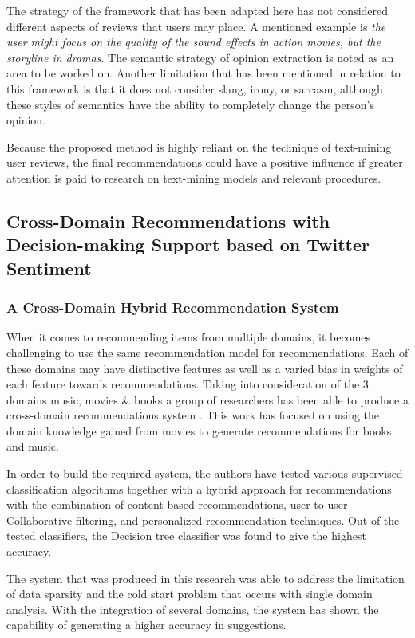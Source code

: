 \documentclass[manuscript,screen,review]{acmart}
\begin{document}
The strategy of the framework that has been adapted here has not considered different aspects of reviews that users may place. A mentioned example is \emph{the user might focus on the quality of the sound effects in action movies, but the storyline in dramas}. The semantic strategy of opinion extraction is noted as an area to be worked on. Another limitation that has been mentioned in relation to this framework is that it does not consider slang, irony, or sarcasm, although these styles of semantics have the ability to completely change the person's opinion.

Because the proposed method is highly reliant on the technique of text-mining user reviews, the final recommendations could have a positive influence if greater attention is paid to research on text-mining models and relevant procedures.


\subsection{Cross-Domain Recommendations with Decision-making Support based on Twitter Sentiment}
\subsubsection{A Cross-Domain Hybrid Recommendation System}
When it comes to recommending items from multiple domains, it becomes challenging to use the same recommendation model for recommendations. Each of these domains may have distinctive features as well as a varied bias in weights of each feature towards recommendations.
Taking into consideration of the 3 domains music, movies \& books a group of researchers has been able to produce a cross-domain recommendations system \cite{pes_universitydepartment_of_computer_science_bangalore_560085_india_cross-domain_2018}. This work has focused on using the domain knowledge gained from movies to generate recommendations for books and music.

In order to build the required system, the authors have tested various supervised classification algorithms together with a hybrid approach for recommendations with the combination of content-based recommendations, user-to-user Collaborative filtering, and personalized recommendation techniques. Out of the tested classifiers, the Decision tree classifier was found to give the highest accuracy.

The system that was produced in this research was able to address the limitation of data sparsity and the cold start problem that occurs with single domain analysis. With the integration of several domains, the system has shown the capability of generating a higher accuracy in suggestions.
\end{document}
